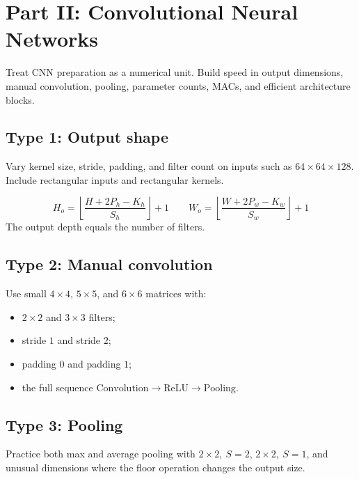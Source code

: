 \documentclass[11pt]{article}
\begin{document}
\section{Part II: Convolutional Neural Networks}

\begin{focusbox}[Objective]
Treat CNN preparation as a numerical unit. Build speed in output dimensions, manual convolution, pooling, parameter counts, MACs, and efficient architecture blocks.
\end{focusbox}

\subsection{Type 1: Output shape}

Vary kernel size, stride, padding, and filter count on inputs such as \(64\times64\times128\). Include rectangular inputs and rectangular kernels.

\begin{formulabox}
\[
\boxed{
H_o=\left\lfloor\frac{H+2P_h-K_h}{S_h}\right\rfloor+1
}
\qquad
\boxed{
W_o=\left\lfloor\frac{W+2P_w-K_w}{S_w}\right\rfloor+1
}
\]
The output depth equals the number of filters.
\end{formulabox}

\subsection{Type 2: Manual convolution}

Use small \(4\times4\), \(5\times5\), and \(6\times6\) matrices with:

\begin{itemize}
  \item \(2\times2\) and \(3\times3\) filters;
  \item stride \(1\) and stride \(2\);
  \item padding \(0\) and padding \(1\);
  \item the full sequence \(\text{Convolution}\to\text{ReLU}\to\text{Pooling}\).
\end{itemize}

\subsection{Type 3: Pooling}

Practice both max and average pooling with \(2\times2,\ S=2\), \(2\times2,\ S=1\), and unusual dimensions where the floor operation changes the output size.
\end{document}
